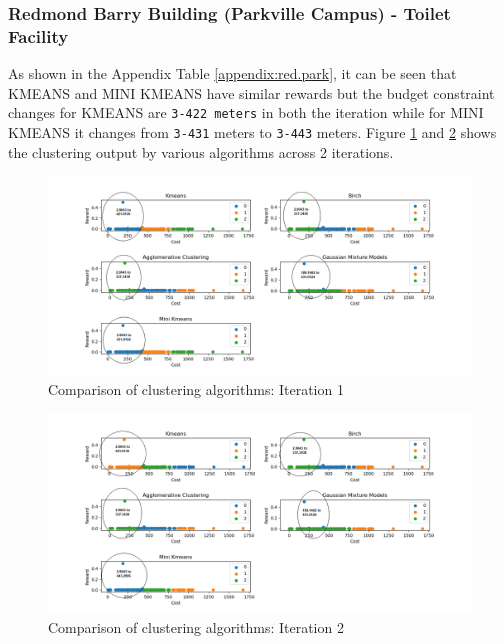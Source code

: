 
\subsubsection {Redmond Barry Building (Parkville Campus) - Toilet Facility}
As shown in the Appendix Table \ref{appendix:red.park}, it can be seen that KMEANS and MINI KMEANS have similar rewards but the budget constraint changes for KMEANS are \texttt{3-422 meters} in both the iteration while for MINI KMEANS it changes from \texttt{3-431} meters to \texttt{3-443} meters.
 Figure \ref{fig:iter3} and \ref{fig:iter4} shows the clustering output by various algorithms across 2 iterations.

\begin{figure}[H]
\centering
\includegraphics[width=15cm]{resources/115_1.png}
\caption{Comparison of clustering algorithms: Iteration 1}
\label{fig:iter3}
\end{figure}

\begin{figure}[H]
\centering
\includegraphics[width=15cm]{resources/115_2.png}
\caption{Comparison of clustering algorithms: Iteration 2}
\label{fig:iter4}
\end{figure}

